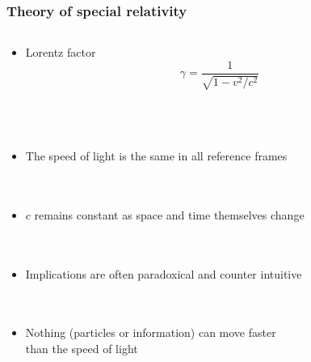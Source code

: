 \documentclass[mathserif,8pt]{beamer}
\begin{document}
\begin{frame}
    \frametitle{Theory of special relativity}
    \begin{columns}
    \begin{column}{.60\textwidth}
	\begin{itemize}
	\item Lorentz factor
	\begin{equation}
	    \nonumber
	    \gamma = \frac{1}{\sqrt{1-v^2/c^2}}
	\end{equation}
	\ \\
	\ \\
	\ \\
	\item The speed of light is the same in all reference frames\\
	\ \\
	\ \\
	\item $c$ remains constant as space and time themselves change\\
	\ \\
	\ \\
	\item Implications are often paradoxical and counter intuitive\\
	\ \\
	\ \\
	\item Nothing (particles or information) can move faster\\ than the speed of light\\
	\end{itemize}
	\ \\
	\ \\
	\ \\
	\ \\
	\centering

\end{column}
\end{columns}
\end{frame}
\end{document}
